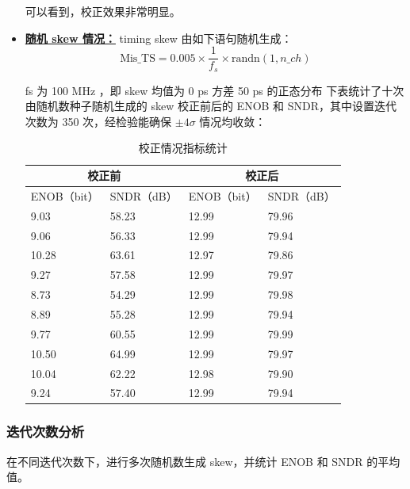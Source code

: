 \documentclass[cs4size,a4paper]{ctexart}
\numberwithin{equation}{section}
\numberwithin{table}{section}
\numberwithin{figure}{section}
\begin{document}
\begin{itemize}
		
		可以看到，校正效果非常明显。
		
		\item
		\textbf{\underline{随机 skew 情况：}}
		timing skew 由如下语句随机生成：
		\[
		\text{Mis\_TS} = 0.005 \times \frac{1}{f_s} \times \text{randn}(1, n\_ch)
		\]
		
		\noindent 
		fs 为 100 MHz ，即 skew 均值为 0 ps 方差 50 ps 的正态分布
		下表统计了十次由随机数种子随机生成的 skew 校正前后的 ENOB 和 SNDR，其中设置迭代次数为 350 次，经检验能确保 $\pm 4 \sigma$ 情况均收敛：

        	\begin{table}[H]
        		\centering
        		\caption{校正情况指标统计}
        		\begin{tabular}{|l|l|l|l|}
        			\hline \multicolumn{2}{|c|}{校正前} & \multicolumn{2}{|c|}{校正后} \\
        			\hline ENOB（bit） & SNDR（dB） & ENOB（bit） & SNDR（dB） \\
        			\hline 9.03 & 58.23 & 12.99 & 79.96 \\
        			\hline 9.06 & 56.33 & 12.99 & 79.94 \\
        			\hline 10.28 & 63.61 & 12.97 & 79.86 \\
        			\hline 9.27 & 57.58 & 12.99 & 79.97 \\
        			\hline 8.73 & 54.29 & 12.99 & 79.98 \\
        			\hline 8.89 & 55.28 & 12.99 & 79.94 \\
        			\hline 9.77 & 60.55 & 12.99 & 79.99 \\
        			\hline 10.50 & 64.99 & 12.99 & 79.97 \\
        			\hline 10.04 & 62.22 & 12.98 & 79.90 \\
        			\hline 9.24 & 57.40 & 12.99 & 79.94 \\
        			\hline
        		\end{tabular}
        	\end{table}

		\end{itemize}
		
		\subsubsection{迭代次数分析}
		在不同迭代次数下，进行多次随机数生成 skew，并统计 ENOB 和 SNDR 的平均值。
\end{document}
